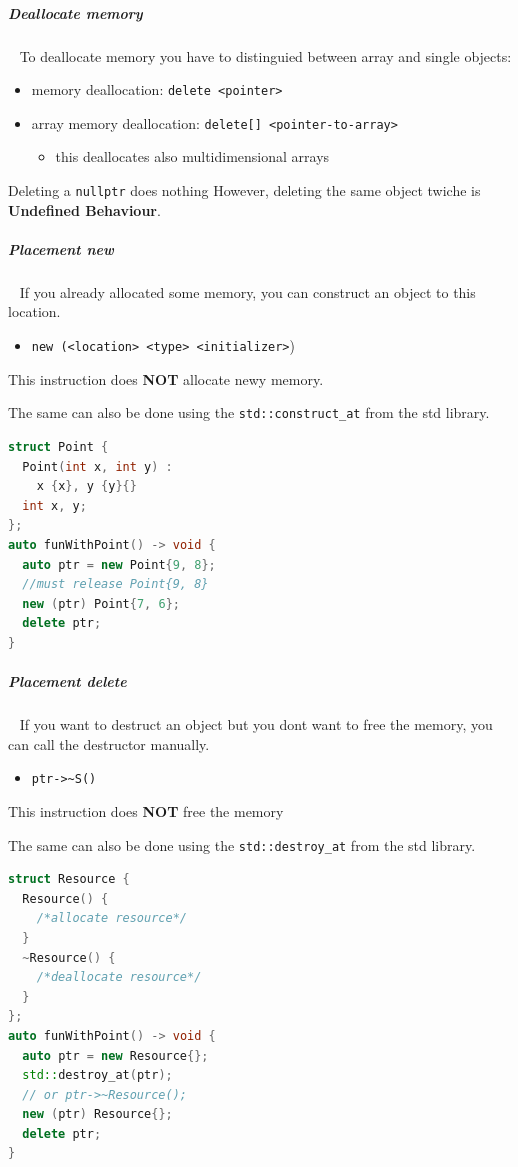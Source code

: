 \documentclass[11pt,twoside,landscape]{article}
\begin{document}
\begin{multicols}{2}
\subparagraph{Deallocate memory} \
\label{sec:org41d2ea5}
To deallocate memory you have to distinguied between array and single objects:
\begin{itemize}
\item memory deallocation: \texttt{delete <pointer>}
\item array memory deallocation: \texttt{delete[] <pointer-to-array>}
\begin{itemize}
\item this deallocates also multidimensional arrays
\end{itemize}
\end{itemize}


Deleting a \texttt{nullptr} does nothing
However, deleting the same object twiche is \textbf{Undefined Behaviour}.
\subparagraph{Placement new} \
\label{sec:org9999eed}
If you already allocated some memory, you can construct an object to this location.
\begin{itemize}
\item \texttt{new (<location> <type> <initializer>})
\end{itemize}

This instruction does \textbf{NOT} allocate newy memory.

The same can also be done using the \texttt{std::construct\_at} from the std library.




\begin{lstlisting}[language=c++,numbers=none]
struct Point {
  Point(int x, int y) :
    x {x}, y {y}{}
  int x, y;
};
auto funWithPoint() -> void {
  auto ptr = new Point{9, 8};
  //must release Point{9, 8}
  new (ptr) Point{7, 6};
  delete ptr;
}
\end{lstlisting}

\subparagraph{Placement delete} \
\label{sec:org37c23b5}
If you want to destruct an object but you dont want to free the memory, you can call the destructor manually.
\begin{itemize}
\item \texttt{ptr->\textasciitilde{}S()}
\end{itemize}

This instruction does \textbf{NOT} free the memory

The same can also be done using the \texttt{std::destroy\_at} from the std library.


\begin{lstlisting}[language=c++,label=lst:example-for-placement-new-and-delete,caption={Example for placement new and delete},captionpos=b,numbers=none]
struct Resource {
  Resource() {
    /*allocate resource*/
  }
  ~Resource() {
    /*deallocate resource*/
  }
};
auto funWithPoint() -> void {
  auto ptr = new Resource{};
  std::destroy_at(ptr);
  // or ptr->~Resource();
  new (ptr) Resource{};
  delete ptr;
}
\end{lstlisting}


\end{multicols}
\end{document}
